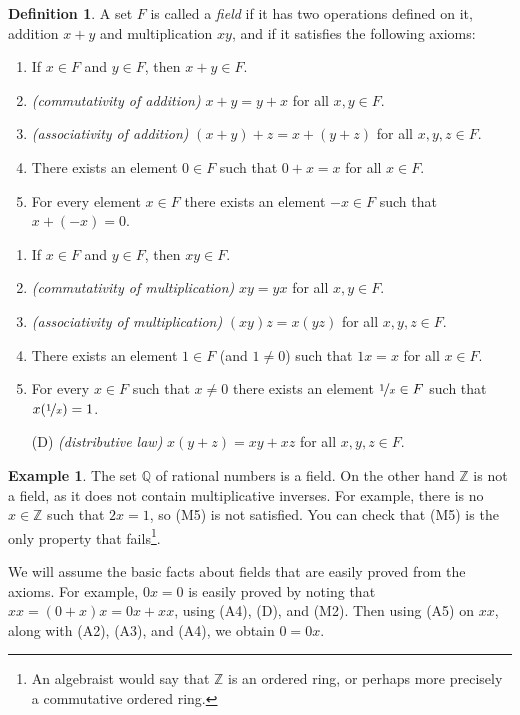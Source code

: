 \documentclass[12pt]{book}
\newcommand{\Z}{{\mathbb{Z}}}
\newcommand{\Q}{{\mathbb{Q}}}
\newcommand{\myindex}[1]{#1\index{#1}}
\theoremstyle{plain}
\theoremstyle{remark}
\theoremstyle{definition}
\newtheorem{defn}[thm]{Definition}
\theoremstyle{exercise}
\theoremstyle{example}
\newtheorem{example}[thm]{Example}
\begin{document}
\begin{defn}
A set $F$ is called a \emph{\myindex{field}} if it has two operations
defined on it, addition $x+y$ and multiplication $xy$, and if it satisfies
the following axioms:
\begin{enumerate}[({A}1)]
\item If $x \in F$ and $y \in F$, then $x+y \in F$.
\item \emph{(commutativity of addition)}
$x+y = y+x$ for all $x,y \in F$.
\item \emph{(associativity of addition)}
$(x+y)+z = x+(y+z)$ for all $x,y,z \in F$.
\item There exists an element $0 \in F$ such that
$0+x = x$ for all $x \in F$.
\item For every element $x\in F$ there exists an element $-x \in F$
such that $x + (-x) = 0$.
\end{enumerate}
\begin{enumerate}[({M}1)]
\item If $x \in F$ and $y \in F$, then $xy \in F$.
\item \emph{(commutativity of multiplication)}
$xy = yx$ for all $x,y \in F$.
\item \emph{(associativity of multiplication)}
$(xy)z = x(yz)$ for all $x,y,z \in F$.
\item There exists an element $1 \in F$ (and $1 \not= 0$) such that
$1x = x$ for all $x \in F$.
\item For every $x\in F$ such that $x \not= 0$ there exists an element
$\nicefrac{1}{x} \in F$
such that $x(\nicefrac{1}{x}) = 1$.
\item[(D)] \emph{(distributive law)} $x(y+z) = xy+xz$
for all $x,y,z \in F$.
\end{enumerate}
\end{defn}

\begin{example}
The set $\Q$ of rational numbers is a field.  On the other hand $\Z$ is not a
field, as it does not contain multiplicative inverses.  For example,
there is no $x \in \Z$ such that $2x = 1$, so (M5) is not satisfied.  You
can check that (M5) is the only property that fails\footnote{An algebraist would say that $\Z$ is an ordered
ring, or perhaps more precisely a commutative ordered ring.}.
\end{example}

We will assume the basic facts about fields that are easily 
proved from the axioms.  For example, $0x = 0$ is easily proved
by noting that $xx = (0+x)x = 0x+xx$, using (A4), (D), and (M2).  Then
using (A5) on $xx$, along with (A2), (A3), and (A4), we obtain $0 = 0x$.
\end{document}
